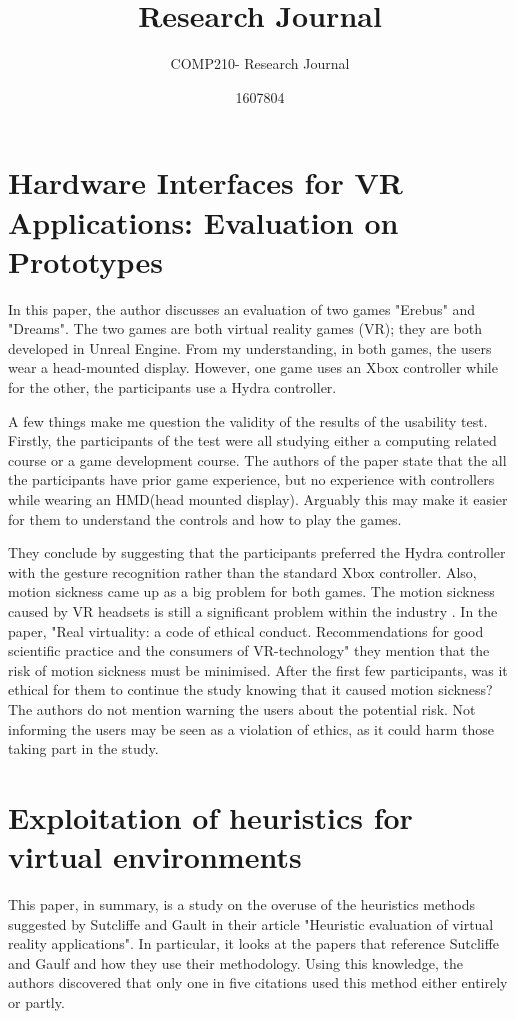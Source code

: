 \documentclass{scrartcl}
\title{Research Journal}
\subtitle{COMP210- Research Journal}
\author{1607804}
\begin{document}
\maketitle

\section{Hardware Interfaces for VR Applications: Evaluation on Prototypes\cite{mentzelopoulos2015hardware}}

In this paper, the author discusses an evaluation of two games "Erebus" and "Dreams".
The two games are both virtual reality games (VR); they are both developed in Unreal Engine.
From my understanding, in both games, the users wear a head-mounted display. However, one game uses an Xbox controller while for the other, the participants use a Hydra controller. 

A few things make me question the validity of the results of the usability test.
Firstly, the participants of the test were all studying either a computing related course or a game development course. 
The authors of the paper state that the all the participants have prior game experience, but no experience with controllers while wearing an HMD(head mounted display). 
Arguably this may make it easier for them to understand the controls and how to play the games.

They conclude by suggesting that the participants preferred the Hydra controller with the gesture recognition rather than the standard Xbox controller. 
Also, motion sickness came up as a big problem for both games. The motion sickness caused by VR headsets is still a significant problem within the industry\cite{von2016cyber}\cite{fernandes2016combating} \cite{hettinger1992visually}. In the paper, "Real virtuality: a code of ethical conduct. Recommendations for good scientific practice and the consumers of VR-technology" \cite{madary2016real} they mention that the risk of motion sickness must be minimised\cite{behr2005some}. After the first few participants, was it ethical for them to continue the study knowing that it caused motion sickness? The authors do not mention warning the users about the potential risk.  Not informing the users may be seen as a violation of ethics, as it could harm those taking part in the study. 

\section{Exploitation of heuristics for virtual environments \cite {hvannberg2012exploitation}}
This paper, in summary, is a study on the overuse of the heuristics methods suggested by Sutcliffe and Gault in their article "Heuristic evaluation of virtual reality applications"\cite{sutcliffe2004heuristic}. In particular, it looks at the papers that reference Sutcliffe and Gaulf and how they use their methodology. Using this knowledge, the authors discovered that only one in five citations used this method either entirely or partly.
\end{document}

